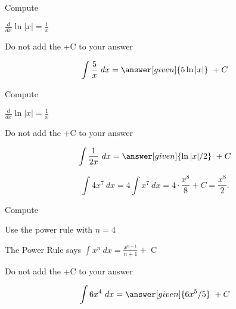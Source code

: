 \documentclass{ximera}
\begin{document}
\begin{problem} %
Compute

\begin{hint}
$\frac{d}{dx} \ln|x| = \frac{1}{x}$
\end{hint}
\begin{hint}
\begin{center}
Do not add the +C to your answer
\end{center}
\end{hint}

\[
\int \frac{5}{x} \ dx =
\answer[given]{5\ln|x|} \ +  C
\]
\end{problem}

\begin{problem} %
Compute

\begin{hint}
$\frac{d}{dx} \ln|x| = \frac{1}{x}$
\end{hint}
\begin{hint}
\begin{center}
Do not add the +C to your answer
\end{center}
\end{hint}

\[
\int \frac{1}{2x} \ dx =
\answer[given]{\ln|x| /2} \ +  C
\]
\end{problem}


\begin{example} %
\[
\int 4x^7 \ dx = 4 \int x^7 \ dx = 4\cdot \frac{x^8}{8} +C 
= \frac{x^8}{2}.
\]
\end{example}


\begin{problem} %
Compute 

\begin{hint}
Use the power rule with $n=4$
\end{hint}
\begin{hint}
The Power Rule says $\int x^n \ dx = \frac{x^{n+1}}{n+1} +$ C
\end{hint}
\begin{hint}
\begin{center}
Do not add the +C to your answer
\end{center}
\end{hint}

\[
\int 6x^4 \ dx =
\answer[given]{6x^5 /5} \ + C
\]
\end{problem}
\end{document}
